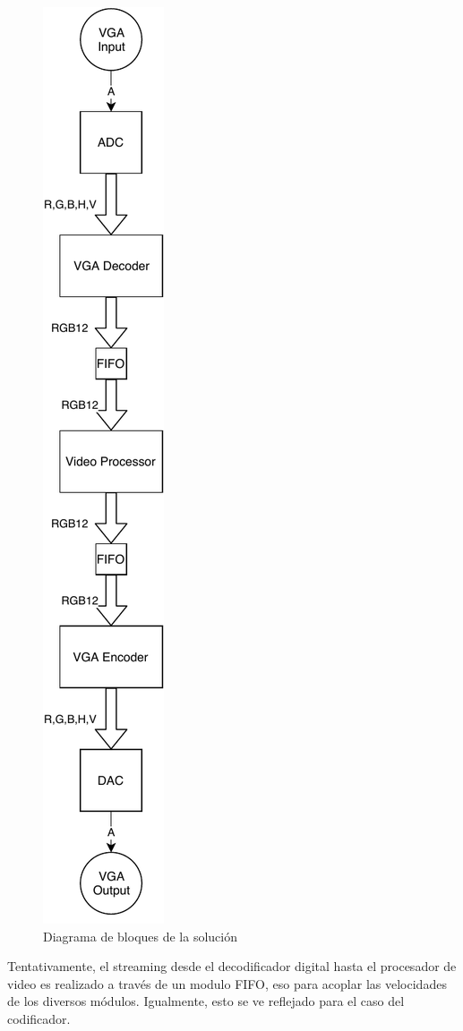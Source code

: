 \documentclass[10pt, letterpaper, conference]{IEEEtran}
\begin{document}
\begin{figure}
  \centering
  \includegraphics[width=0.25\columnwidth]{img/block_diagram.pdf}
  \caption{Diagrama de bloques de la solución}
  \label{fig:block_diagram}
\end{figure}

Tentativamente, el streaming desde el decodificador digital hasta el 
procesador de video es realizado a través de un modulo FIFO, eso para acoplar 
las velocidades de los diversos módulos. Igualmente, esto se ve reflejado 
para el caso del codificador.%
\end{document}
